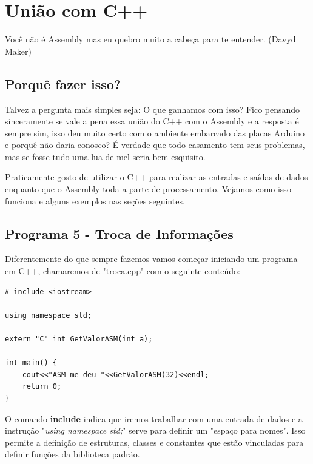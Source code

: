 \chapter{União com C++}

\begin{remark}
	Você não é Assembly mas eu quebro muito a cabeça para te entender. (Davyd Maker) 
\end{remark}

\section{Porquê fazer isso?}
Talvez a pergunta mais simples seja: O que ganhamos com isso? Fico pensando sinceramente se vale a pena essa união do C++ com o Assembly e a resposta é sempre sim, isso deu muito certo com o ambiente embarcado das placas Arduino e porquê não daria conosco? É verdade que todo casamento tem seus problemas, mas se fosse tudo uma lua-de-mel seria bem esquisito.

Praticamente gosto de utilizar o C++ para realizar as entradas e saídas de dados enquanto que o Assembly toda a parte de processamento. Vejamos como isso funciona e alguns exemplos nas seções seguintes.

\section{Programa 5 - Troca de Informações}

Diferentemente do que sempre fazemos vamos começar iniciando um programa em C++, chamaremos de "troca.cpp" com o seguinte conteúdo:
\begin{lstlisting}[]
# include <iostream>

using namespace std;

extern "C" int GetValorASM(int a);

int main() {
	cout<<"ASM me deu "<<GetValorASM(32)<<endl;
	return 0;
}
\end{lstlisting}

O comando \textbf{include} indica que iremos trabalhar com uma entrada de dados e a instrução "\textit{using namespace std;}" serve para definir um "espaço para nomes". Isso permite a definição de estruturas, classes e constantes que estão vinculadas para definir funções da biblioteca padrão. 

